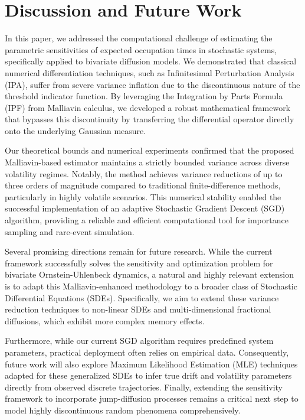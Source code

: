 \documentclass[11pt]{article}
\begin{document}
\section{Discussion and Future Work} \label{sec:conclusion} 

In this paper, we addressed the computational challenge of estimating the parametric sensitivities of expected occupation times in stochastic systems, specifically applied to bivariate diffusion models. We demonstrated that classical numerical differentiation techniques, such as Infinitesimal Perturbation Analysis (IPA), suffer from severe variance inflation due to the discontinuous nature of the threshold indicator function. By leveraging the Integration by Parts Formula (IPF) from Malliavin calculus, we developed a robust mathematical framework that bypasses this discontinuity by transferring the differential operator directly onto the underlying Gaussian measure. 

Our theoretical bounds and numerical experiments confirmed that the proposed Malliavin-based estimator maintains a strictly bounded variance across diverse volatility regimes. Notably, the method achieves variance reductions of up to three orders of magnitude compared to traditional finite-difference methods, particularly in highly volatile scenarios. This numerical stability enabled the successful implementation of an adaptive Stochastic Gradient Descent (SGD) algorithm, providing a reliable and efficient computational tool for importance sampling and rare-event simulation.

Several promising directions remain for future research. While the current framework successfully solves the sensitivity and optimization problem for bivariate Ornstein-Uhlenbeck dynamics, a natural and highly relevant extension is to adapt this Malliavin-enhanced methodology to a broader class of Stochastic Differential Equations (SDEs). Specifically, we aim to extend these variance reduction techniques to non-linear SDEs and multi-dimensional fractional diffusions, which exhibit more complex memory effects. 

Furthermore, while our current SGD algorithm requires predefined system parameters, practical deployment often relies on empirical data. Consequently, future work will also explore Maximum Likelihood Estimation (MLE) techniques adapted for these generalized SDEs to infer true drift and volatility parameters directly from observed discrete trajectories. Finally, extending the sensitivity framework to incorporate jump-diffusion processes remains a critical next step to model highly discontinuous random phenomena comprehensively.





\end{document}
